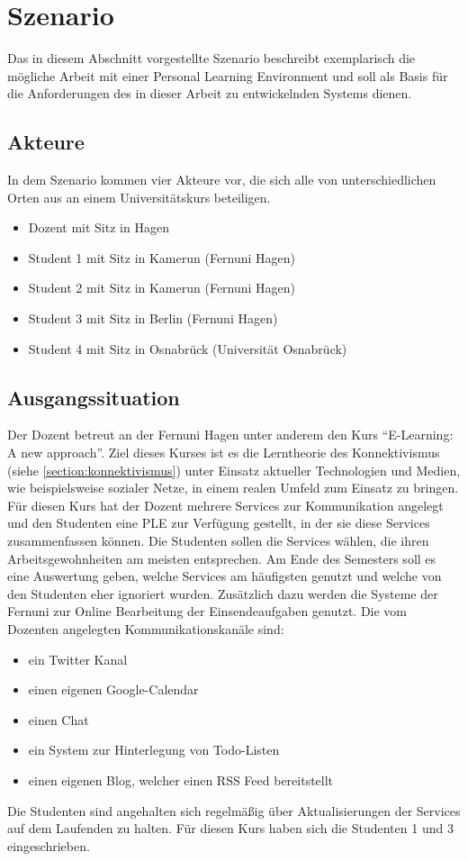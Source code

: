 \section{Szenario}
Das in diesem Abschnitt vorgestellte Szenario beschreibt exemplarisch die mögliche Arbeit mit einer Personal Learning Environment und soll als Basis für die Anforderungen des in dieser Arbeit zu entwickelnden Systems dienen. 

\subsection{Akteure}
In dem Szenario kommen vier Akteure vor, die sich alle von unterschiedlichen Orten aus an einem Universitätskurs beteiligen.

\begin{itemize}
 \item Dozent mit Sitz in Hagen
 \item Student 1 mit Sitz in Kamerun (Fernuni Hagen)
 \item Student 2 mit Sitz in Kamerun (Fernuni Hagen)
 \item Student 3 mit Sitz in Berlin (Fernuni Hagen)
 \item Student 4 mit Sitz in Osnabrück (Universität Osnabrück) 
\end{itemize}

\subsection{Ausgangssituation}\label{section:ausgangssituation}
Der Dozent betreut an der Fernuni Hagen unter anderem den Kurs "`E-Learning: A new approach"'. Ziel dieses Kurses ist es die Lerntheorie des Konnektivismus (siehe \ref{section:konnektivismus}) unter Einsatz aktueller Technologien und Medien, wie beispielsweise sozialer Netze, in einem realen Umfeld zum Einsatz zu bringen.  Für diesen Kurs hat der Dozent mehrere Services zur Kommunikation angelegt und den Studenten eine PLE zur Verfügung gestellt, in der sie diese Services zusammenfassen können. Die Studenten sollen die Services wählen, die ihren Arbeitsgewohnheiten am meisten entsprechen. Am Ende des Semesters soll es eine Auswertung geben, welche Services am häufigsten genutzt und welche von den Studenten eher ignoriert wurden. Zusätzlich dazu werden die Systeme der Fernuni zur Online Bearbeitung der Einsendeaufgaben genutzt. Die vom Dozenten angelegten Kommunikationskanäle sind:
\begin{itemize}
 \item ein Twitter Kanal
 \item einen eigenen Google-Calendar
 \item einen Chat
 \item ein System zur Hinterlegung von Todo-Listen
 \item einen eigenen Blog, welcher einen RSS Feed bereitstellt 
\end{itemize}
Die Studenten sind angehalten sich regelmäßig über Aktualisierungen der Services auf dem Laufenden zu halten. Für diesen Kurs haben sich die Studenten 1 und 3 eingeschrieben.

